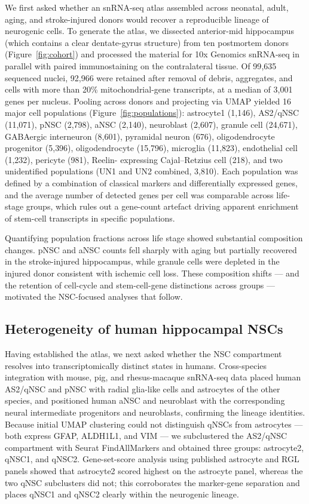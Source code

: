 \documentclass[11pt]{article}
\begin{document}
We first asked whether an snRNA-seq atlas assembled across neonatal, adult,
aging, and stroke-injured donors would recover a reproducible lineage of
neurogenic cells. To generate the atlas, we dissected anterior-mid
hippocampus (which contains a clear dentate-gyrus structure) from ten
postmortem donors (Figure~\ref{fig:cohort}) and processed the material for
10x Genomics snRNA-seq in parallel with paired immunostaining on the
contralateral tissue. Of 99{,}635 sequenced nuclei, 92{,}966 were retained
after removal of debris, aggregates, and cells with more than 20\%
mitochondrial-gene transcripts, at a median of 3{,}001 genes per nucleus.
Pooling across donors and projecting via UMAP yielded 16 major cell
populations (Figure~\ref{fig:populations}): astrocyte1 (1{,}146),
AS2/qNSC (11{,}071), pNSC (2{,}798), aNSC (2{,}140), neuroblast (2{,}607),
granule cell (24{,}671), GABAergic interneuron (8{,}601), pyramidal neuron
(676), oligodendrocyte progenitor (5{,}396), oligodendrocyte (15{,}796),
microglia (11{,}823), endothelial cell (1{,}232), pericyte (981), Reelin-
expressing Cajal--Retzius cell (218), and two unidentified populations
(UN1 and UN2 combined, 3{,}810). Each population was defined by a
combination of classical markers and differentially expressed genes, and
the average number of detected genes per cell was comparable across
life-stage groups, which rules out a gene-count artefact driving apparent
enrichment of stem-cell transcripts in specific populations.

Quantifying population fractions across life stage showed substantial
composition changes. pNSC and aNSC counts fell sharply with aging but
partially recovered in the stroke-injured hippocampus, while granule cells
were depleted in the injured donor consistent with ischemic cell loss.
These composition shifts --- and the retention of cell-cycle and
stem-cell-gene distinctions across groups --- motivated the NSC-focused
analyses that follow.

\subsection{Heterogeneity of human hippocampal NSCs}

Having established the atlas, we next asked whether the NSC compartment
resolves into transcriptomically distinct states in humans. Cross-species
integration with mouse, pig, and rhesus-macaque snRNA-seq data placed human
AS2/qNSC and pNSC with radial glia-like cells and astrocytes of the other
species, and positioned human aNSC and neuroblast with the corresponding
neural intermediate progenitors and neuroblasts, confirming the lineage
identities. Because initial UMAP clustering could not distinguish qNSCs
from astrocytes --- both express GFAP, ALDH1L1, and VIM
\cite{zamanian2012genomic,liddelow2017neurotoxic} --- we subclustered the
AS2/qNSC compartment with Seurat FindAllMarkers and obtained three groups:
astrocyte2, qNSC1, and qNSC2. Gene-set-score analysis using published
astrocyte and RGL panels \cite{clarke2018normal,hochgerner2018conserved}
showed that astrocyte2 scored highest on the astrocyte panel, whereas the
two qNSC subclusters did not; this corroborates the marker-gene separation
and places qNSC1 and qNSC2 clearly within the neurogenic lineage.
\end{document}
